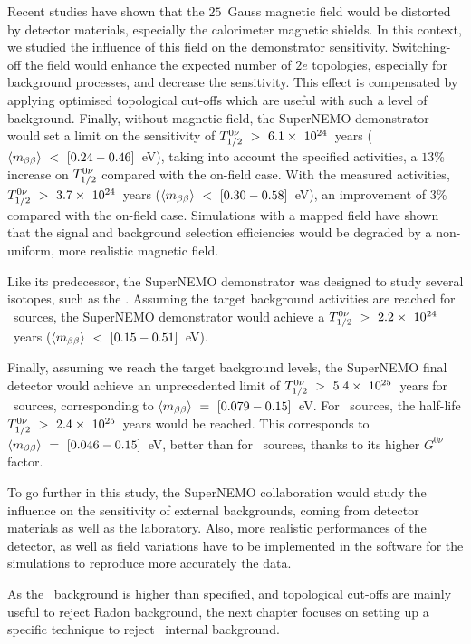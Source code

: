 Recent studies have shown that the $25$~Gauss magnetic field would be distorted by detector materials, especially the calorimeter magnetic shields.
In this context, we studied the influence of this field on the demonstrator sensitivity.
Switching-off the field would enhance the expected number of $2e$ topologies, especially for background processes, and decrease the sensitivity.
This effect is compensated by applying optimised topological cut-offs which are useful with such a level of background.
Finally, without magnetic field, the SuperNEMO demonstrator would set a limit on the sensitivity of $T_{1/2}^{0\nu}~>~6.1\times~10^{24}$~years ($\langle m_{\beta\beta}\rangle~<~[0.24-0.46]$~eV), taking into account the specified activities, a $13$\% increase on $T_{1/2}^{0\nu}$ compared with the on-field case.
With the measured activities, $T_{1/2}^{0\nu}~>~3.7\times~10^{24}$~years ($\langle m_{\beta\beta}\rangle~<~[0.30-0.58]$~eV), an improvement of $3$\% compared with the on-field case.
Simulations with a mapped field have shown that the signal and background selection efficiencies would be degraded by a non-uniform, more realistic magnetic field.

Like its predecessor, the SuperNEMO demonstrator was designed to study several isotopes, such as the \Nd.
Assuming the target background activities are reached for \Nd\ sources, the SuperNEMO demonstrator would achieve a $T_{1/2}^{0\nu}~>~2.2\times~10^{24}$~years ($\langle m_{\beta\beta}\rangle~<~[0.15-0.51]$~eV).

Finally, assuming we reach the target background levels, the SuperNEMO final detector would achieve an unprecedented limit of $T_{1/2}^{0\nu}~>~5.4\times~10^{25}$~years for \Se\ sources, corresponding to $\langle m_{\beta\beta}\rangle~=~[0.079-0.15]$~eV.
For \Nd\ sources, the half-life $T_{1/2}^{0\nu}~>~2.4\times~10^{25}$~years would be reached.
This corresponds to $\langle m_{\beta\beta}\rangle~=~[0.046-0.15]$~eV, better than for \Se\ sources, thanks to its higher $G^{0\nu}$ factor.

To go further in this study, the SuperNEMO collaboration would study the influence on the sensitivity of external backgrounds, coming from detector materials as well as the laboratory.
Also, more realistic performances of the detector, as well as field variations have to be implemented in the software for the simulations to reproduce more accurately the data.

As the \Tl\ background is higher than specified, and topological cut-offs are mainly useful to reject Radon background, the next chapter focuses on setting up a specific technique to reject \Tl\ internal background.

